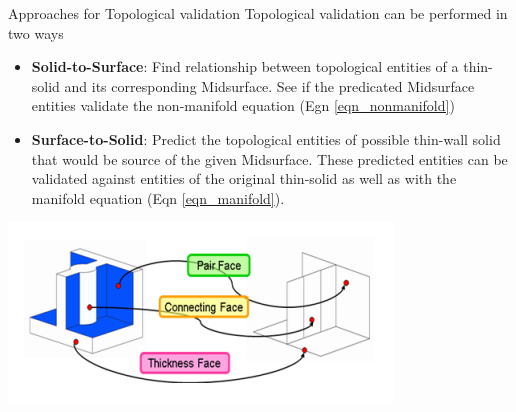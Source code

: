 \begin{frame}{Approaches for Topological validation}
Topological validation can be performed in two ways
\begin{itemize}[noitemsep,label=\textbullet,topsep=2pt,parsep=2pt,partopsep=2pt]
\item \textbf{Solid-to-Surface}: Find relationship between topological entities of a thin-solid and its corresponding Midsurface. See if the predicated Midsurface entities validate the non-manifold equation (Egn \ref{eqn_nonmanifold})
\item  \textbf{Surface-to-Solid}: Predict the topological entities of possible thin-wall solid that would be source of the given Midsurface.  These predicted entities can be validated against entities of the original thin-solid as well as with the manifold equation (Eqn \ref{eqn_manifold}).
\end{itemize}

\vspace{-5mm}

\begin{center}
\includegraphics[width=0.6\linewidth]{../Common/images/SolidToSurface}
\end{center}

\end{frame}

